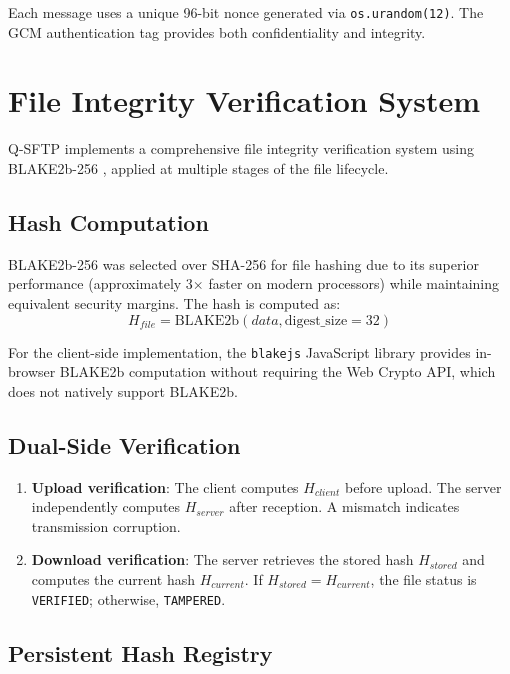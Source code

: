 \documentclass[12pt, a4paper]{article}
\begin{document}
Each message uses a unique 96-bit nonce generated via \texttt{os.urandom(12)}. The GCM authentication tag provides both confidentiality and integrity.

\section{File Integrity Verification System}
\label{sec:integrity}

Q-SFTP implements a comprehensive file integrity verification system using BLAKE2b-256 \parencite{aumasson2013blake2}, applied at multiple stages of the file lifecycle.

\subsection{Hash Computation}

BLAKE2b-256 was selected over SHA-256 for file hashing due to its superior performance (approximately 3$\times$ faster on modern processors) while maintaining equivalent security margins. The hash is computed as:
\[
H_{file} = \text{BLAKE2b}(data, \text{digest\_size} = 32)
\]

For the client-side implementation, the \texttt{blakejs} JavaScript library provides in-browser BLAKE2b computation without requiring the Web Crypto API, which does not natively support BLAKE2b.

\subsection{Dual-Side Verification}

\begin{enumerate}[label=\arabic*., itemsep=2pt]
    \item \textbf{Upload verification}: The client computes $H_{client}$ before upload. The server independently computes $H_{server}$ after reception. A mismatch indicates transmission corruption.
    \item \textbf{Download verification}: The server retrieves the stored hash $H_{stored}$ and computes the current hash $H_{current}$. If $H_{stored} = H_{current}$, the file status is \texttt{VERIFIED}; otherwise, \texttt{TAMPERED}.
\end{enumerate}

\subsection{Persistent Hash Registry}
\end{document}
